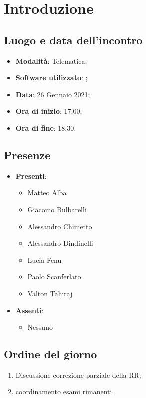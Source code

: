 \documentclass[]{article}
\begin{document}
	
	
	
	\newpage
	
	
		\section{Introduzione}
		\subsection{Luogo e data dell'incontro}
		\begin{itemize}
			\item \textbf{Modalità}: Telematica;
			\item \textbf{Software utilizzato}: ;
			\item \textbf{Data}: 26 Gennaio 2021;
			\item \textbf{Ora di inizio}: 17:00;
			\item \textbf{Ora di fine}: 18:30.
		\end{itemize}

		\subsection{Presenze}
		\begin{itemize}
			\item \textbf{Presenti}:
			\begin{itemize}
				\item Matteo Alba
				\item Giacomo Bulbarelli
				\item Alessandro Chimetto
				\item Alessandro Dindinelli
				\item Lucia Fenu
				\item Paolo Scanferlato
				\item Valton Tahiraj
			\end{itemize}
			\item \textbf{Assenti}:
			\begin{itemize}
				\item Nessuno
			\end{itemize}
		\end{itemize}


		\subsection{Ordine del giorno}
		\begin{enumerate}
			\item Discussione correzione parziale della RR;
			\item coordinamento esami rimanenti.
		\end{enumerate}
\end{document}
